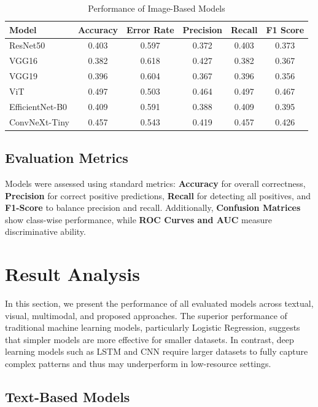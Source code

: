 \documentclass[11pt]{article}
\begin{document}
\begin{table}[h]
\footnotesize
\centering
\caption{Performance of Image-Based Models}
\begin{tabular}{|l|c|c|c|c|c|}
\hline
\textbf{Model} & \textbf{Accuracy} & \textbf{Error Rate} & \textbf{Precision} & \textbf{Recall} & \textbf{F1 Score} \\
\hline
ResNet50 & 0.403 & 0.597 & 0.372 & 0.403 & 0.373 \\
VGG16 & 0.382 & 0.618 & 0.427 & 0.382 & 0.367 \\
VGG19 & 0.396 & 0.604 & 0.367 & 0.396 & 0.356 \\
ViT & 0.497 & 0.503 & 0.464 & 0.497 & 0.467 \\
EfficientNet-B0 & 0.409 & 0.591 & 0.388 & 0.409 & 0.395 \\
ConvNeXt-Tiny & 0.457 & 0.543 & 0.419 & 0.457 & 0.426 \\
\hline
\end{tabular}
\label{tab:image_models}
\end{table}


\subsection{Evaluation Metrics}

Models were assessed using standard metrics: \textbf{Accuracy} for overall correctness, \textbf{Precision} for correct positive predictions, \textbf{Recall} for detecting all positives, and \textbf{F1-Score} to balance precision and recall. Additionally, \textbf{Confusion Matrices} show class-wise performance, while \textbf{ROC Curves and AUC} measure discriminative ability.


\section{Result Analysis}

In this section, we present the performance of all evaluated models across textual, visual, multimodal, and proposed approaches. The superior performance of traditional machine learning models, particularly Logistic Regression, suggests that simpler models are more effective for smaller datasets. In contrast, deep learning models such as LSTM and CNN require larger datasets to fully capture complex patterns and thus may underperform in low-resource settings.

\subsection{Text-Based Models}
\end{document}
